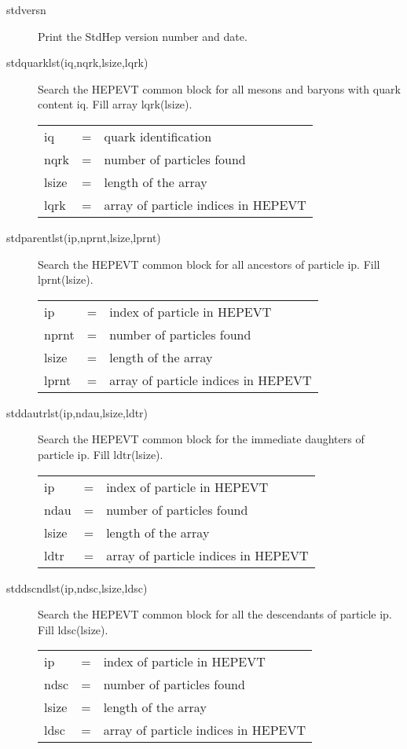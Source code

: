 \begin{description}
\item[stdversn] Print the StdHep version number and date.
\item[stdquarklst(iq,nqrk,lsize,lqrk)]
 Search the HEPEVT common block for all mesons and baryons with quark
 content iq.  Fill array lqrk(lsize).

\begin{tabular}{lcl}
iq    & = & quark identification \\
nqrk  & = & number of particles found \\
lsize & = & length of the array \\
lqrk  & = & array of particle indices in HEPEVT \\
\end{tabular}

\item[stdparentlst(ip,nprnt,lsize,lprnt)]
 Search the HEPEVT common block for all ancestors of particle ip.
 Fill lprnt(lsize).

\begin{tabular}{lcl}
ip    & = & index of particle in HEPEVT \\
nprnt & = & number of particles found \\
lsize & = & length of the array \\
lprnt & = & array of particle indices in HEPEVT \\
\end{tabular}

\item[stddautrlst(ip,ndau,lsize,ldtr)]
 Search the HEPEVT common block for the immediate daughters of particle ip.
 Fill ldtr(lsize).

\begin{tabular}{lcl}
ip    & = & index of particle in HEPEVT \\
ndau  & = & number of particles found \\
lsize & = & length of the array \\
ldtr  & = & array of particle indices in HEPEVT \\
\end{tabular}

\item[stddscndlst(ip,ndsc,lsize,ldsc)]
 Search the HEPEVT common block for all the descendants of particle ip.
 Fill ldsc(lsize).

\begin{tabular}{lcl}
ip    & = & index of particle in HEPEVT \\
ndsc  & = & number of particles found \\
lsize & = & length of the array \\
ldsc  & = & array of particle indices in HEPEVT \\
\end{tabular}


\end{description}
